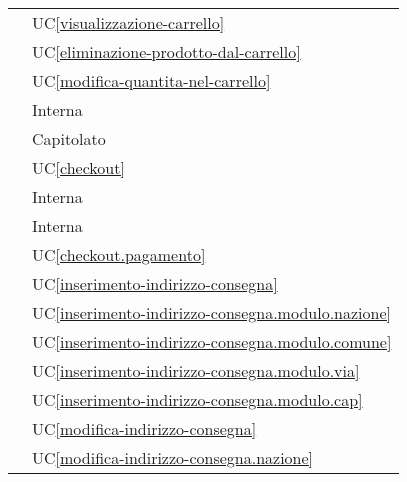 \begin{longtable}{C{6cm} C{6cm}}
     & UC\ref{visualizzazione-carrello} \\

     & UC\ref{eliminazione-prodotto-dal-carrello} \\

     & UC\ref{modifica-quantita-nel-carrello} \\

     & Interna \\

     & Capitolato \\

     & UC\ref{checkout} \\

     & Interna \\

     & Interna \\

     & UC\ref{checkout.pagamento} \\

     & UC\ref{inserimento-indirizzo-consegna} \\

     & UC\ref{inserimento-indirizzo-consegna.modulo.nazione} \\

     & UC\ref{inserimento-indirizzo-consegna.modulo.comune} \\

     & UC\ref{inserimento-indirizzo-consegna.modulo.via} \\

     & UC\ref{inserimento-indirizzo-consegna.modulo.cap} \\

     & UC\ref{modifica-indirizzo-consegna} \\

     & UC\ref{modifica-indirizzo-consegna.nazione} \\


\end{longtable}
